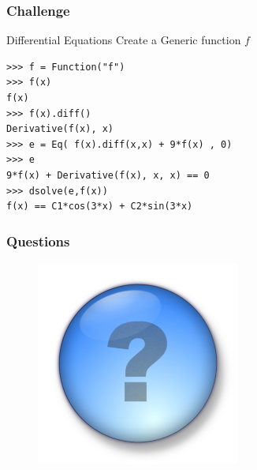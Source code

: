\documentclass[10pt,colorlinks]{beamer}
\begin{document}

\begin{frame}[fragile]\frametitle{Challenge}
\begin{block}{Differential Equations}
Create a Generic function $f$
\begin{verbatim}
>>> f = Function("f")
>>> f(x)
f(x)
>>> f(x).diff()
Derivative(f(x), x)
>>> e = Eq( f(x).diff(x,x) + 9*f(x) , 0)
>>> e
9*f(x) + Derivative(f(x), x, x) == 0
>>> dsolve(e,f(x))
f(x) == C1*cos(3*x) + C2*sin(3*x)
\end{verbatim}


\end{block}

\end{frame}


\begin{frame}\frametitle{Questions}
\begin{figure}[!htb]
    \centering
    \includegraphics[width=0.6\textwidth]{figs/question}
\end{figure}
\end{frame}
\end{document}
